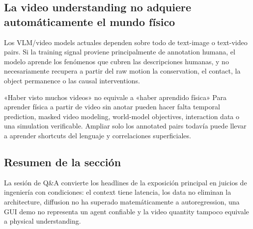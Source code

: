 \subsection{La video understanding no adquiere automáticamente el mundo físico}

Los VLM/video models actuales dependen sobre todo de text-image o text-video pairs. Si la training signal proviene principalmente de annotation humana, el modelo aprende los fenómenos que cubren las descripciones humanas, y no necesariamente recupera a partir del raw motion la conservation, el contact, la object permanence o las causal interventions.

\begin{warningbox}{«Haber visto muchos videos» no equivale a «haber aprendido física»}
Para aprender física a partir de video sin anotar pueden hacer falta temporal prediction, masked video modeling, world-model objectives, interaction data o una simulation verificable. Ampliar solo los annotated pairs todavía puede llevar a aprender shortcuts del lenguaje y correlaciones superficiales.
\end{warningbox}


\subsection{Resumen de la sección}

La sesión de Q\&A convierte los headlines de la exposición principal en juicios de ingeniería con condiciones: el context tiene latencia, los data no eliminan la architecture, diffusion no ha superado matemáticamente a autoregression, una GUI demo no representa un agent confiable y la video quantity tampoco equivale a physical understanding.
